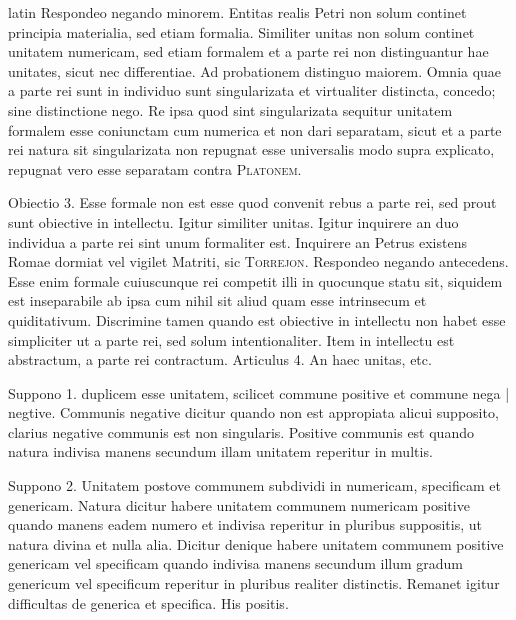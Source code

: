 \begin{otherlanguage*}{latin}
\pstart
Respondeo negando minorem. Entitas realis Petri non solum continet principia materialia, sed etiam formalia. Similiter unitas non solum continet unitatem numericam, sed etiam formalem et a parte rei non distinguantur hae unitates, sicut nec differentiae. Ad probationem distinguo maiorem. Omnia quae a parte rei sunt in individuo sunt singularizata et virtualiter distincta, concedo; sine distinctione nego. Re ipsa quod sint singularizata sequitur unitatem formalem esse coniunctam cum numerica et non dari separatam, sicut et a parte rei natura sit singularizata non repugnat esse universalis modo supra explicato, repugnat vero esse separatam contra \textsc{Platonem}. 
\pend

\pstart
Obiectio 3. Esse formale non est esse quod convenit rebus a parte rei, sed prout sunt obiective in intellectu. Igitur similiter unitas. Igitur inquirere an duo individua a parte rei sint unum formaliter est. Inquirere an Petrus existens Romae dormiat vel vigilet Matriti, sic \textsc{Torrejon}. Respondeo negando antecedens. Esse enim formale cuiuscunque rei competit illi in quocunque statu sit, siquidem est inseparabile ab ipsa cum nihil sit aliud quam esse intrinsecum et quiditativum. Discrimine tamen quando est obiective in intellectu non habet esse simpliciter ut a parte rei, sed solum intentionaliter. Item in intellectu est abstractum, a parte rei contractum. Articulus 4. An haec unitas, etc. 
\pend

\pstart
{}
\pend

\pstart
Suppono 1.  duplicem esse unitatem, scilicet commune positive et commune nega \textnormal{|} negtive. Communis negative dicitur quando non est appropiata alicui supposito, clarius negative communis est non singularis. Positive communis est quando natura indivisa manens secundum illam unitatem reperitur in multis. 
\pend

\pstart
Suppono 2. Unitatem postove communem subdividi in numericam, specificam et genericam. Natura dicitur habere unitatem communem numericam positive quando manens eadem numero et indivisa reperitur in pluribus suppositis, ut natura divina et nulla alia. Dicitur denique habere unitatem communem positive genericam vel specificam quando indivisa manens secundum illum gradum genericum vel specificum reperitur in pluribus realiter distinctis. Remanet igitur difficultas de generica et specifica. His positis. 
\pend


\end{otherlanguage*}

